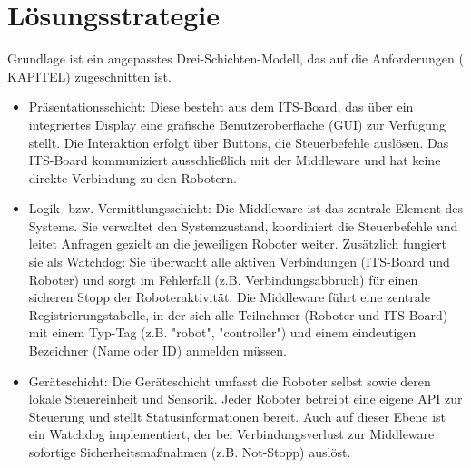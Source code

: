\chapter{Lösungsstrategie}


Grundlage ist ein angepasstes Drei-Schichten-Modell, das auf die Anforderungen ( KAPITEL)
zugeschnitten ist.
 

\begin{itemize}
	\item{Präsentationsschicht:} Diese besteht aus dem ITS-Board, das über ein integriertes Display eine grafische Benutzeroberfläche (GUI) zur Verfügung stellt. Die Interaktion erfolgt über Buttons, die Steuerbefehle auslösen. Das ITS-Board kommuniziert ausschließlich mit der Middleware und hat keine direkte Verbindung zu den Robotern. 
	
	\item{Logik- bzw. Vermittlungsschicht:} Die Middleware ist das zentrale Element des Systems. Sie verwaltet den Systemzustand, koordiniert die Steuerbefehle und leitet Anfragen gezielt an die jeweiligen Roboter weiter. Zusätzlich fungiert sie als Watchdog: Sie überwacht alle aktiven Verbindungen (ITS-Board und Roboter) und sorgt im Fehlerfall (z.B. Verbindungsabbruch) für einen sicheren Stopp der Roboteraktivität. Die Middleware führt eine zentrale Registrierungstabelle, in der sich alle Teilnehmer (Roboter und ITS-Board) mit einem Typ-Tag (z.B. "robot", "controller") und einem eindeutigen Bezeichner (Name oder ID) anmelden müssen.
	
	\item{Geräteschicht:} Die Geräteschicht umfasst die Roboter selbst sowie deren lokale Steuereinheit und Sensorik. Jeder Roboter betreibt eine eigene API zur Steuerung und stellt Statusinformationen bereit. Auch auf dieser Ebene ist ein Watchdog implementiert, der bei Verbindungsverlust zur Middleware sofortige Sicherheitsmaßnahmen (z.B. Not-Stopp) auslöst.
	
	
\end{itemize} 

